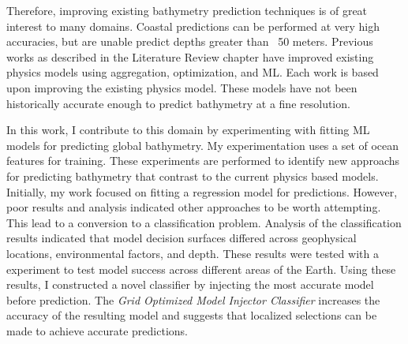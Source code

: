 \par
Therefore, improving existing bathymetry prediction techniques is of great interest to many domains.
Coastal predictions can be performed at very high accuracies, but are unable predict depths greater than ~50 meters.
Previous works as described in the Literature Review chapter have improved existing physics models using aggregation, optimization, and \ac{ML}.
Each work is based upon improving the existing physics model.
These models have not been historically accurate enough to predict bathymetry at a fine resolution.

\par
In this work, I contribute to this domain by experimenting with fitting \ac{ML} models for predicting global bathymetry.
My experimentation uses a set of ocean features for training.
These experiments are performed to identify new approachs for predicting bathymetry that contrast to the current physics based models.
Initially,  my work focused on fitting a regression model for predictions.
However, poor results and analysis indicated other approaches to be worth attempting.
This lead to a conversion to a classification problem.
Analysis of the classification results indicated that model decision surfaces differed across geophysical locations, environmental factors, and depth.
These results were tested with a experiment to test model success across different areas of the Earth.
Using these results, I constructed a novel classifier by injecting the most accurate model before prediction.
The \textit{Grid Optimized Model Injector Classifier} increases the accuracy of the resulting model and suggests that localized selections can be made to achieve accurate predictions.